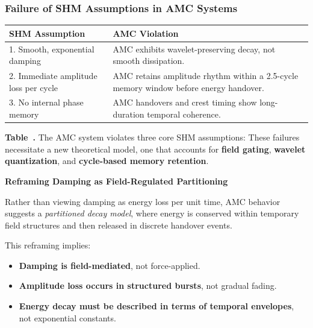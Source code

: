 \documentclass[10pt,aps,pre,onecolumn,superscriptaddress,notitlepage]{revtex4-2}
\begin{document}
\subsubsection{Failure of SHM Assumptions in AMC Systems}

\begin{center}
  \renewcommand{\arraystretch}{1.25} %
  \begin{tabular}{|p{6.8cm}|p{6.8cm}|}
    \hline
    \textbf{SHM Assumption} & \textbf{AMC Violation} \\
    \hline
    1. Smooth, exponential damping & AMC exhibits wavelet-preserving decay, not smooth dissipation. \\
    \hline
    2. Immediate amplitude loss per cycle & AMC retains amplitude rhythm within a 2.5-cycle memory window before energy handover. \\
    \hline
    3. No internal phase memory & AMC handovers and crest timing show long-duration temporal coherence. \\
    \hline
  \end{tabular}

  \smallskip
  \textbf{Table~\thetable.} The AMC system violates three core SHM assumptions: These failures necessitate a new theoretical model, one that accounts for \textbf{field gating}, \textbf{wavelet quantization}, and \textbf{cycle-based memory retention}.
  \label{tab:shm_failures}
\end{center}

\vspace{1em}
\hrulefill
\vspace{1em}

\noindent
\textbf{Reframing Damping as Field-Regulated Partitioning}

\medskip
\noindent
Rather than viewing damping as energy loss per unit time, AMC behavior suggests a \textit{partitioned decay model}, where energy is conserved within temporary field structures and then released in discrete handover events.

\medskip
\noindent
This reframing implies:
\begin{itemize}
    \item \textbf{Damping is field-mediated}, not force-applied.
    \item \textbf{Amplitude loss occurs in structured bursts}, not gradual fading.
    \item \textbf{Energy decay must be described in terms of temporal envelopes}, not exponential constants.
\end{itemize}
\end{document}
